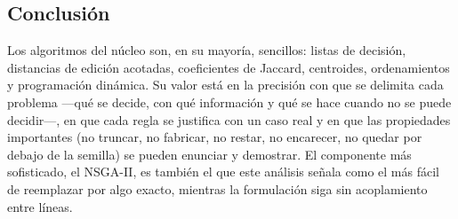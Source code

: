 \subsection{Conclusión}

Los algoritmos del núcleo son, en su mayoría, sencillos: listas de
decisión, distancias de edición acotadas, coeficientes de Jaccard, centroides,
ordenamientos y programación dinámica. Su valor está en la precisión con que
se delimita cada problema ---qué se decide, con qué información y qué se hace
cuando no se puede decidir---, en que cada regla se justifica con un caso real
y en que las propiedades importantes (no truncar, no fabricar, no restar, no
encarecer, no quedar por debajo de la semilla) se pueden enunciar y demostrar.
El componente más sofisticado, el NSGA-II, es también el que este análisis
señala como el más fácil de reemplazar por algo exacto, mientras la
formulación siga sin acoplamiento entre líneas.
